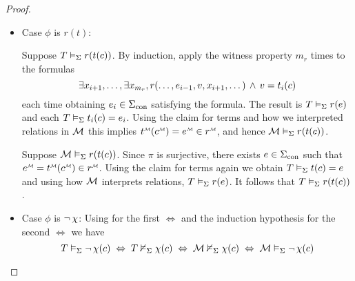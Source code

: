 \begin{proof}
\begin{itemize}
        \item Case $\phi$ is $r(t)$:
            \begin{forward}
                Suppose $T \vDash_{\Sigma} r(t(c))$.
                By induction, 
                apply the witness property 
                $m_r$ times to the formulas
                \[\exists x_{i + 1}, \dots, 
                \exists x_{m_r}, r(
                    \dots, e_{i-1}, v , x_{i+1},\dots
                    ) \, \land \, v = t_i(c)\]
                each time obtaining $e_i \in {\Sigma}_\mathrm{con}$ satisfying the formula.
                The result is $T \vDash_{\Sigma} r(e)$ and each
                $T \vDash_{\Sigma} t_i(c) = e_i$.
                Using the claim for terms and 
                how we interpreted relations in $\mathcal{M}$ this implies
                $\mmintp{t}(\mmintp{c}) = \mmintp{e} \in \mmintp{r}$,
                and hence $\mathcal{M} \vDash_{\Sigma} r(t(c))$.
            \end{forward}

            \begin{backward}
                Suppose $\mathcal{M} \vDash_{\Sigma} r(t(c))$.
                Since $\pi$ is surjective, 
                there exists $e \in {\Sigma}_\mathrm{con}$ 
                such that $\mmintp{e} = \mmintp{t}(\mmintp{c}) \in \mmintp{r}$.
                Using the claim for terms again
                we obtain $T \vDash_{\Sigma} t(c) = e$ and 
                using how $\mathcal{M}$ interprets relations,
                $T \vDash_{\Sigma} r(e)$.
                It follows that $T \vDash_{\Sigma} r(t(c))$.
            \end{backward}
        
        \item Case $\phi$ is $\neg\, \chi$:
            Using  
            for the first $\iff$
            and the induction hypothesis for the second $\iff$ we have
            \[T \vDash_{\Sigma} \neg\, \chi(c) \; \Leftrightarrow \;  
            T \nvDash_{\Sigma} \chi(c) \; \Leftrightarrow \; \mathcal{M} \nvDash_{\Sigma} \chi(c) \; \Leftrightarrow \;
            \mathcal{M} \vDash_{\Sigma} \neg\, \chi(c)\]


\end{itemize}
\end{proof}
